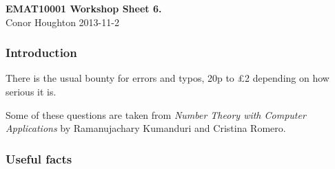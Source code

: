 \documentclass[12pt]{article}
\begin{document}
\begin{center}
{\bf EMAT10001 Workshop Sheet 6.}\\[1cm]{} Conor Houghton 2013-11-2
\end{center}
\subsubsection*{Introduction} 
There is the usual bounty for errors and typos, 20p to \pounds 2
depending on how serious it is.

Some of these questions are taken from \emph{Number Theory with
  Computer Applications} by Ramanujachary Kumanduri and Cristina
Romero.

\subsubsection*{Useful facts}
\end{document}
